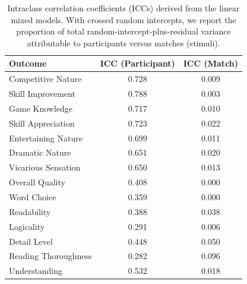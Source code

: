 \begin{table}[H]
  \centering\small
  \begin{tabular}{lcc}
    \toprule
    \textbf{Outcome} & \textbf{ICC (Participant)} & \textbf{ICC (Match)} \\
    \midrule
    Competitive Nature & 0.728 & 0.009 \\
    Skill Improvement & 0.788 & 0.003 \\
    Game Knowledge & 0.717 & 0.010 \\
    Skill Appreciation & 0.723 & 0.022 \\
    Entertaining Nature & 0.699 & 0.011 \\
    Dramatic Nature & 0.651 & 0.020 \\
    Vicarious Sensation & 0.650 & 0.013 \\
    Overall Quality & 0.408 & 0.000 \\
    Word Choice & 0.359 & 0.000 \\
    Readability & 0.388 & 0.038 \\
    Logicality & 0.291 & 0.006 \\
    Detail Level & 0.448 & 0.050 \\
    Reading Thoroughness & 0.282 & 0.096 \\
    Understanding & 0.532 & 0.018 \\
    \bottomrule
  \end{tabular}
  \caption{Intraclass correlation coefficients (ICCs) derived from the linear mixed models. With crossed random intercepts, we report the proportion of total random-intercept-plus-residual variance attributable to participants versus matches (stimuli).}
  \label{tab:icc}
\end{table}

\endgroup
